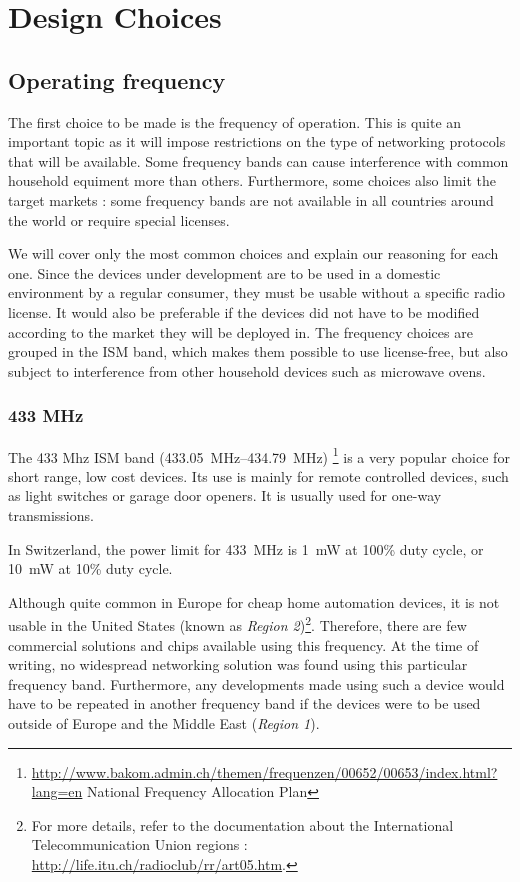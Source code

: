 \chapter{Design Choices}\label{ch:choices}

\section{Operating frequency}\label{sec:frequency}

The first choice to be made is the frequency of operation. This is quite an
important topic as it will impose restrictions on the type of networking
protocols that will be available. Some frequency bands can cause interference
with common household equiment more than others. Furthermore, some choices also
limit the target markets : some frequency bands are not available in all
countries around the world or require special licenses.

We will cover only the most common choices and explain our reasoning for each
one. Since the devices under development are to be used in a domestic
environment by a regular consumer, they must be usable without a specific radio
license. It would also be preferable if the devices did not have to be modified
according to the market they will be deployed in. The frequency choices are
grouped in the \ac{ISM} band, which makes them possible to use license-free, but
also subject to interference from other household devices such as microwave
ovens.

\subsection{433 MHz}

The 433 Mhz ISM band (\SIrange{433.05}{434.79}{MHz})
\footnote{\url{http://www.bakom.admin.ch/themen/frequenzen/00652/00653/index.html?lang=en}
National Frequency Allocation Plan} is a very popular choice for short range,
low cost devices. Its use is mainly for remote controlled devices, such as light
switches or garage door openers. It is usually used for one-way transmissions.

In Switzerland, the power limit for \SI{433}{MHz} is \SI{1}{mW} at 100\% duty
cycle, or \SI{10}{mW} at 10\% duty cycle.


Although quite common in Europe for cheap home automation
devices, it is not usable in the United States (known as \emph{Region
2})\footnote{For more details, refer to the documentation about the
  International Telecommunication Union regions
  : \url{http://life.itu.ch/radioclub/rr/art05.htm}.}.
Therefore, there are few commercial solutions and chips available using this
frequency. At the time of writing, no widespread networking solution was found
using this particular frequency band.  Furthermore, any developments made using
such a device would have to be repeated in another frequency band if the devices
were to be used outside of Europe and the Middle East (\emph{Region 1}).


